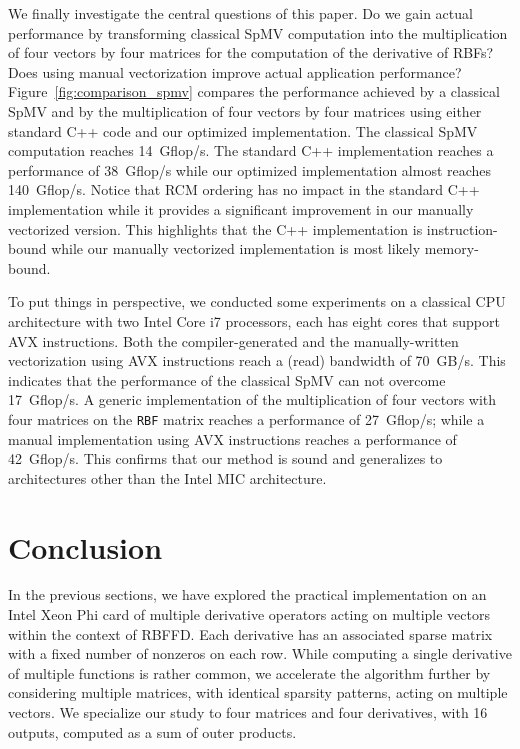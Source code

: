 \documentclass[10pt,conference,compsocconf]{IEEEtran}
\begin{document}
We finally investigate the central questions of this paper. Do we gain
actual performance by transforming classical SpMV computation into the
multiplication of four vectors by four matrices for the computation of the
derivative of RBFs? Does using manual vectorization improve actual
application performance? Figure~\ref{fig:comparison_spmv} compares the
performance achieved by a classical SpMV and by the multiplication of
four vectors by four matrices using either standard C++ code and our
optimized implementation. The
classical SpMV computation reaches 14~Gflop/s. 
The standard C++ implementation reaches a performance of 38~Gflop/s while our
optimized implementation almost reaches 140~Gflop/s. 
Notice that 
RCM ordering has no impact in the standard C++ implementation while it
provides a significant improvement in our manually vectorized
version. This highlights that the C++ implementation is instruction-bound
while our manually vectorized implementation is most likely 
memory-bound. 

To put things in perspective, we conducted some experiments on a
classical CPU architecture with two Intel Core i7 processors, each has eight
cores that support AVX instructions. Both the compiler-generated and
the manually-written vectorization using AVX instructions reach a
(read) bandwidth of 70~GB/s. This indicates that the performance of
the classical SpMV can not overcome 17~Gflop/s. A generic
implementation of the multiplication of four vectors with four matrices on
the {\tt RBF} matrix reaches a performance of 27~Gflop/s; while a
manual implementation using AVX instructions reaches a performance of
42~Gflop/s. This confirms that our method is sound and generalizes to
architectures other than the Intel MIC architecture.

\vspace{-0.5em}
\section{Conclusion}
\label{sec:ccl}

In the previous sections, we have explored the practical
implementation on an Intel Xeon Phi card of multiple derivative
operators acting on multiple vectors within the context of
RBFFD. Each derivative has an associated sparse matrix with a fixed
number of nonzeros on each row. While computing a single derivative of
multiple functions is rather common, we accelerate the algorithm further 
by considering multiple
matrices, with identical sparsity patterns, acting on multiple vectors. 
We specialize our study to four matrices and four derivatives,
with 16 outputs, computed as a sum of outer products.
\end{document}
